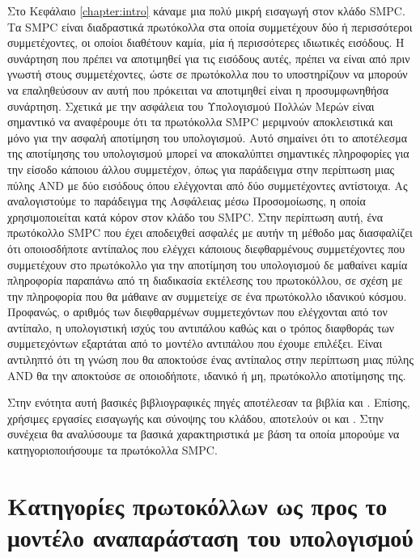 Στο Κεφάλαιο \ref{chapter:intro} κάναμε μια πολύ μικρή εισαγωγή στον κλάδο SMPC. Τα SMPC είναι διαδραστικά πρωτόκολλα στα οποία συμμετέχουν δύο ή περισσότεροι συμμετέχοντες, οι οποίοι διαθέτουν καμία, μία ή περισσότερες ιδιωτικές εισόδους. Η συνάρτηση που πρέπει να αποτιμηθεί για τις εισόδους αυτές, πρέπει να είναι από πριν γνωστή στους συμμετέχοντες, ώστε σε πρωτόκολλα που το υποστηρίζουν να μπορούν να επαληθεύσουν αν αυτή που πρόκειται να αποτιμηθεί είναι η προσυμφωνηθήσα συνάρτηση. Σχετικά με την ασφάλεια του Υπολογισμού Πολλών Μερών είναι σημαντικό να αναφέρουμε ότι τα πρωτόκολλα SMPC μεριμνούν αποκλειστικά και μόνο για την ασφαλή αποτίμηση του υπολογισμού. Αυτό σημαίνει ότι το αποτέλεσμα της αποτίμησης του υπολογισμού μπορεί να αποκαλύπτει σημαντικές πληροφορίες για την είσοδο κάποιου άλλου συμμετέχον, όπως για παράδειγμα στην περίπτωση μιας πύλης AND με δύο εισόδους όπου ελέγχονται από δύο συμμετέχοντες αντίστοιχα. Ας αναλογιστούμε το παράδειγμα της Ασφάλειας μέσω Προσομοίωσης, η οποία χρησιμοποιείται κατά κόρον στον κλάδο του SMPC. Στην περίπτωση αυτή, ένα πρωτόκολλο SMPC που έχει αποδειχθεί ασφαλές με αυτήν τη μέθοδο μας διασφαλίζει ότι οποιοσδήποτε αντίπαλος που ελέγχει κάποιους διεφθαρμένους συμμετέχοντες που συμμετέχουν στο πρωτόκολλο για την αποτίμηση του υπολογισμού δε μαθαίνει καμία πληροφορία παραπάνω από τη διαδικασία εκτέλεσης του πρωτοκόλλου, σε σχέση με την πληροφορία που θα μάθαινε αν συμμετείχε σε ένα πρωτόκολλο ιδανικού κόσμου. Προφανώς, ο αριθμός των διεφθαρμένων συμμετεχόντων που ελέγχονται από τον αντίπαλο, η υπολογιστική ισχύς του αντιπάλου καθώς και ο τρόπος διαφθοράς των συμμετεχόντων εξαρτάται από το μοντέλο αντιπάλου που έχουμε επιλέξει. Είναι αντιληπτό ότι τη γνώση που θα αποκτούσε ένας αντίπαλος στην περίπτωση μιας πύλης AND θα την αποκτούσε σε οποιοδήποτε, ιδανικό ή μη, πρωτόκολλο αποτίμησης της.

Στην ενότητα αυτή βασικές βιβλιογραφικές πηγές αποτέλεσαν τα βιβλία \cite{10.1561/3300000019} και \cite{cramer2015secure}. Επίσης, χρήσιμες εργασίες εισαγωγής και σύνοψης του κλάδου, αποτελούν οι \cite{cryptoeprint:2020/300} και  \cite{zhao2019secure}. Στην συνέχεια θα αναλύσουμε τα βασικά χαρακτηριστικά με βάση τα οποία μπορούμε να κατηγοριοποιήσουμε τα πρωτόκολλα SMPC.

\section{Κατηγορίες πρωτοκόλλων ως προς το μοντέλο αναπαράσταση του υπολογισμού}

